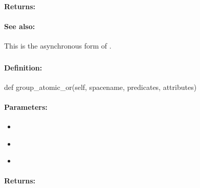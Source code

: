 \paragraph{Returns:}


\paragraph{See also:}  This is the asynchronous form of .

\pagebreak
\subsubsection{}
\label{api:python:group_atomic_or}


\paragraph{Definition:}
\begin{pythoncode}
def group_atomic_or(self, spacename, predicates, attributes)
\end{pythoncode}

\paragraph{Parameters:}
\begin{itemize}[noitemsep]
\item {}\\

\item {}\\

\item {}\\

\end{itemize}

\paragraph{Returns:}


\pagebreak
\subsubsection{}
\label{api:python:async_group_atomic_or}


